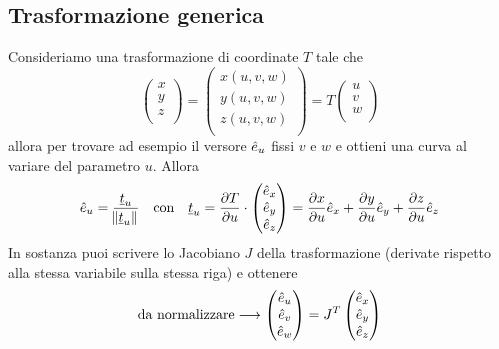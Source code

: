 \documentclass[11pt,landscape]{article}
\begin{document}
\begin{multicols}{3}
    \subsection{Trasformazione generica}
        Consideriamo una trasformazione di coordinate $T$ tale che 
        $$ \begin{pmatrix}
            x\\
            y\\
            z\\
        \end{pmatrix}
        = 
        \begin{pmatrix}
            x(u,v,w)\\
            y(u,v,w)\\
            z(u,v,w)\\
        \end{pmatrix}
        = T \begin{pmatrix}
            u\\ v\\ w\\
            \end{pmatrix}
        $$
        allora per trovare ad esempio il versore $\hat{e}_u$ fissi $v$ e $w$ e ottieni una curva al variare del parametro $u$. Allora 
        $$ \hat{e}_u = \frac{\underline{t}_u}{\norm{\underline{t}_u}} \quad \text{con} \quad \underline{t}_u = \frac{\partial T}{\partial u} \cdot \begin{pmatrix} \hat{e}_x\\ \hat{e}_y \\ \hat{e}_z \end{pmatrix} = \frac{\partial x}{\partial u} \hat{e}_x + \frac{\partial y}{\partial u} \hat{e}_y + \frac{\partial z}{\partial u} \hat{e}_z$$
        In sostanza puoi scrivere lo Jacobiano $J$ della trasformazione (derivate rispetto alla stessa variabile sulla stessa riga) e ottenere
        $$ \text{da normalizzare}\longrightarrow \begin{pmatrix}
            \hat{e}_u\\ \hat{e}_v\\ \hat{e}_w
        \end{pmatrix} = J^T
        \begin{pmatrix}
            \hat{e}_x \\\hat{e}_y\\\hat{e}_z
        \end{pmatrix}$$

\end{multicols}
\end{document}
